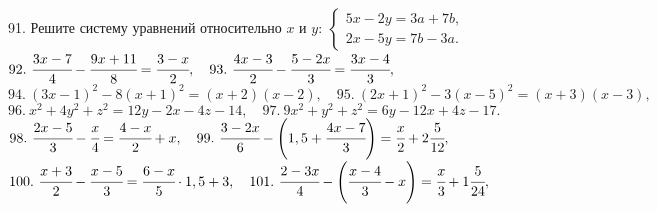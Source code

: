 91. Решите систему уравнений относительно $x$ и $y:\ \begin{cases}5x-2y=3a+7b,\\ 2x-5y=7b-3a. \end{cases}$\\
$92.\ \cfrac{3x-7}{4}-\cfrac{9x+11}{8}=\cfrac{3-x}{2}, \quad 93.\ \cfrac{4x-3}{2}-\cfrac{5-2x}{3}=\cfrac{3x-4}{3},$\\
$94.\ (3x-1)^2-8(x+1)^2=(x+2)(x-2), \quad 95.\ (2x+1)^2-3(x-5)^2=(x+3)(x-3),$\\
$96.\ x^2+4y^2+z^2=12y-2x-4z-14, \quad 97.\ 9x^2+y^2+z^2=6y-12x+4z-17.$\\
$98.\ \cfrac{2x-5}{3}-\cfrac{x}{4}=\cfrac{4-x}{2}+x, \quad 99.\ \cfrac{3-2x}{6}-\left(1,5+\cfrac{4x-7}{3}\right)=\cfrac{x}{2}+2\cfrac{5}{12},$\\
$100.\ \cfrac{x+3}{2}-\cfrac{x-5}{3}=\cfrac{6-x}{5}\cdot1,5+3, \quad 101.\ \cfrac{2-3x}{4}-\left(\cfrac{x-4}{3}-x\right)=\cfrac{x}{3}+1\cfrac{5}{24},$\\
